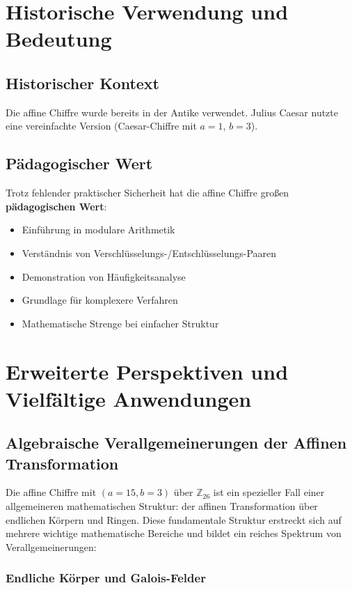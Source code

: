 ﻿\documentclass[12pt,a4paper]{article}
\begin{document}
	\section{Historische Verwendung und Bedeutung}
	
	\subsection{Historischer Kontext}
	
	Die affine Chiffre wurde bereits in der Antike verwendet. Julius Caesar nutzte eine vereinfachte Version (Caesar-Chiffre mit $a=1$, $b=3$).
	
	\subsection{Pädagogischer Wert}
	
	Trotz fehlender praktischer Sicherheit hat die affine Chiffre großen \textbf{pädagogischen Wert}:
	
	\begin{itemize}
		\item Einführung in modulare Arithmetik
		\item Verständnis von Verschlüsselungs-/Entschlüsselungs-Paaren
		\item Demonstration von Häufigkeitsanalyse
		\item Grundlage für komplexere Verfahren
		\item Mathematische Strenge bei einfacher Struktur
	\end{itemize}
	
	\section{Erweiterte Perspektiven und Vielfältige Anwendungen}
	
	\subsection{Algebraische Verallgemeinerungen der Affinen Transformation}
	
	Die affine Chiffre mit $(a=15, b=3)$ über $\mathbb{Z}_{26}$ ist ein spezieller Fall einer allgemeineren mathematischen Struktur: der affinen Transformation über endlichen Körpern und Ringen. Diese fundamentale Struktur erstreckt sich auf mehrere wichtige mathematische Bereiche und bildet ein reiches Spektrum von Verallgemeinerungen:
	
	\subsubsection{Endliche Körper und Galois-Felder}
	
\end{document}
